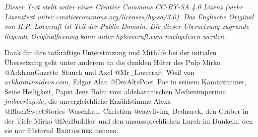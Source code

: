 \maketitle

\textit{Dieser Text steht unter einer Creative Commons CC-BY-SA 4.0 Lizenz
(siehe Lizenztext unter creativecommons.org/licenses/by-sa/3.0). Das Englische Original von H.P. Lovecraft ist Teil der Public Domain. Die dieser Übersetzung zugrunde liegende Originalfassung kann unter hplovecraft.com nachgelesen werden.}

\vspace{18pt}

Dank für ihre tatkräftige Unterstützung und Mithilfe bei der initialen Übersetzung geht unter anderem an die dunklen Hüter des Pulp Mirko \mbox{\glqq @ArkhamGazette\grqq}\ Stauch und Axel \glqq @Mr\_Lovecraft\grqq\ Weiß von $arkhaminsiders.com$, Edgar Alan \mbox{\glqq @DerAltePoet\grqq}\ Poe in seinem Kaminzimmer, Seine Heiligkeit, Papst Jens Bolm vom aldebaranischen Medienimperium $jmbverlag.de$, die unvergleichliche Erzählstimme Alexa \mbox{\glqq @BlackSweetStories\grqq}\ Waschkau, Christian \glqq @eazyliving\grqq\ Bednarek, den Gräber in der Tiefe Mirko \mbox{\glqq @DerBuddler\grqq}\ und den unaussprechlichen Lurch im Dunkeln, den sie nur flüsternd \textsc{Bartoschek} nennen.